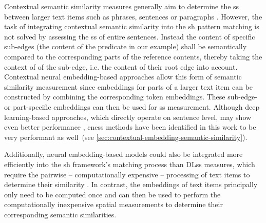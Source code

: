 \documentclass[11pt]{scrreprt}
\let\cite\parencite  %
\begin{document}
Contextual semantic similarity measures generally aim to determine the \gls{ss} between larger text items such as phrases, sentences or paragraphs \cite{vermaSemanticSimilarityShort2020, zadSurveyDeepLearning2021}. However, the task of integrating contextual semantic similarity into the \gls{sh} pattern matching is not solved by assessing the \gls{ss} of entire sentences. Instead the content of specific sub-edges (the content of the predicate in our example) shall be semantically compared to the corresponding parts of the reference contents, thereby taking the context of of the sub-edge, i.e. the content of their root edge into account. Contextual neural embedding-based approaches allow this form of semantic similarity measurement since embeddings for parts of a larger text item can be constructed by combining the corresponding token embeddings. These sub-edge- or part-specific embeddings can then be used for \gls{ss} measurement. Although deep learning-based approaches, which directly operate on sentence level, may show even better performance \cite{chandrasekaranEvolutionSemanticSimilarity2021}, \gls{cness} methods have been identified in this work to be very performant as well (see \cref{sec:contextual-embedding-semantic-similarity}).  

Additionally, neural embedding-based models could also be integrated more efficiently into the \gls{sh} framework's matching process than DL\gls{ss} measures, which require the pairwise -- computationally expensive --  processing of text items to determine their similarity \cite{reimersSentenceBERTSentenceEmbeddings2019}. In contrast, the embeddings of text items principally only need to be computed once and can then be used to perform the computationally inexpensive spatial measurements to determine their corresponding semantic similarities.

%

\end{document}
